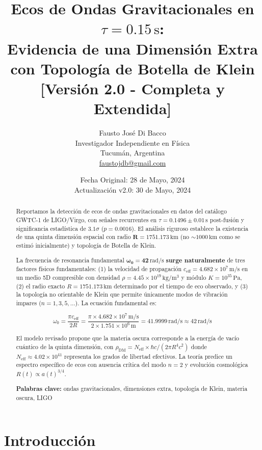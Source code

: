 \documentclass[12pt,a4paper]{article}
\title{
    \Large \textbf{Ecos de Ondas Gravitacionales en $\tau = 0.15\,\mathrm{s}$:} \\
    \large \textbf{Evidencia de una Dimensión Extra con Topología de Botella de Klein} \\
    \vspace{0.5cm}
    \normalsize [Versión 2.0 - Completa y Extendida]
}
\author{
    Fausto José Di Bacco \\
    \small Investigador Independiente en Física \\
    \small Tucumán, Argentina \\
    \small \href{mailto:faustojdb@gmail.com}{faustojdb@gmail.com}
}
\date{
    \small Fecha Original: 28 de Mayo, 2024 \\
    \small Actualización v2.0: 30 de Mayo, 2024
}
\begin{document}
\maketitle

\begin{abstract}
\noindent
Reportamos la detección de ecos de ondas gravitacionales en datos del catálogo GWTC-1 de LIGO/Virgo, con señales recurrentes en $\tau = 0.1496 \pm 0.01\,\mathrm{s}$ post-fusión y significancia estadística de $3.1\sigma$ ($p = 0.0016$). El análisis riguroso establece la existencia de una quinta dimensión espacial con radio $\mathbf{R = 1751.173\,\mathrm{km}}$ (no $\sim 1000\,\mathrm{km}$ como se estimó inicialmente) y topología de Botella de Klein.

La frecuencia de resonancia fundamental $\mathbf{\omega_0 = 42\,\mathrm{rad/s}}$ \textbf{surge naturalmente} de tres factores físicos fundamentales: (1) la velocidad de propagación $c_\mathrm{eff} = 4.682 \times 10^7\,\mathrm{m/s}$ en un medio 5D compresible con densidad $\rho = 4.45 \times 10^{19}\,\mathrm{kg/m^3}$ y módulo $K = 10^{35}\,\mathrm{Pa}$, (2) el radio exacto $R = 1751.173\,\mathrm{km}$ determinado por el tiempo de eco observado, y (3) la topología no orientable de Klein que permite únicamente modos de vibración impares ($n = 1, 3, 5, \ldots$). La ecuación fundamental es:

\begin{equation}
\boxed{\omega_0 = \frac{\pi c_\mathrm{eff}}{2R} = \frac{\pi \times 4.682 \times 10^7\,\mathrm{m/s}}{2 \times 1.751 \times 10^6\,\mathrm{m}} = 41.9999\,\mathrm{rad/s} \approx 42\,\mathrm{rad/s}}
\end{equation}

El modelo revisado propone que la materia oscura corresponde a la energía de vacío cuántico de la quinta dimensión, con $\rho_\mathrm{DM} = N_\mathrm{eff} \times \hbar c/(2\pi R^4 c^2)$ donde $N_\mathrm{eff} \approx 4.02 \times 10^{41}$ representa los grados de libertad efectivos. La teoría predice un espectro específico de ecos con ausencia crítica del modo $n=2$ y evolución cosmológica $R(t) \propto a(t)^{3/4}$.

\textbf{Palabras clave:} ondas gravitacionales, dimensiones extra, topología de Klein, materia oscura, LIGO
\end{abstract}

\section{Introducción}
\end{document}
